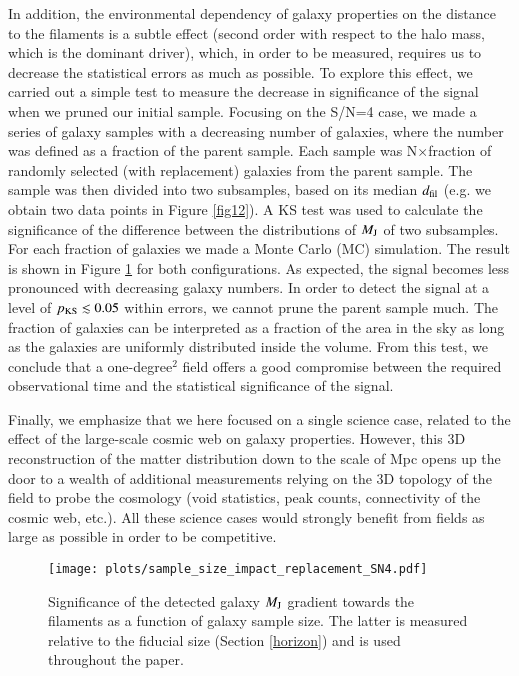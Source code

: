\documentclass{aa}
\begin{document}
In addition, the environmental dependency of galaxy properties on the distance to the filaments is a subtle effect (second order with respect to the halo mass, which is the dominant driver), which, in order to be measured, requires us to decrease the statistical errors as much as possible. To explore this effect, we carried out a simple test to measure the decrease in significance of the signal when we pruned our initial sample. Focusing on the S/N=4 case, we made a series of galaxy samples with a decreasing number of galaxies, where the number was defined as a fraction of the parent sample. Each sample was N$\times$fraction of randomly selected (with replacement) galaxies from the parent sample. The sample was then divided into two subsamples, based on its median $d_{\rm fil}$ (e.g. we obtain two data points in Figure \ref{fig12}). A KS test was used to calculate the significance of the difference between the distributions of $M_{\rm J}$ of two subsamples. For each fraction of galaxies we made a Monte Carlo (MC) simulation. The result is shown in Figure \ref{fig14} for both configurations. As expected, the signal becomes less pronounced with decreasing galaxy numbers. In order to detect the signal at a level of $p_{\rm KS} \lesssim 0.05$ within errors, we cannot prune the parent sample much. The fraction of galaxies can be interpreted as a fraction of the area in the sky as long as the galaxies are uniformly distributed inside the volume. From this test, we conclude that a one-degree$^{2}$ field offers a good compromise between the required observational time and the statistical significance of the signal. 

Finally, we emphasize that we here focused on a single science case, related to the effect of the large-scale cosmic web on galaxy properties. However, this 3D reconstruction of the matter distribution down to the scale of Mpc opens up the door to a wealth of additional measurements relying on the 3D topology of the field to probe the cosmology (void statistics, peak counts, connectivity of the cosmic web, etc.). All these science cases would strongly benefit from fields as large as possible in order to be competitive. 

\begin{figure}
\begin{center}
\texttt{[image: plots/sample\_size\_impact\_replacement\_SN4.pdf]}
\caption{Significance of the detected galaxy $M_{\rm J}$ gradient towards the filaments as a function of galaxy sample size. The latter is measured relative to the fiducial size (Section \ref{horizon}) and is used throughout the paper.}
\label{fig14}
\end{center}
\end{figure}
\end{document}
